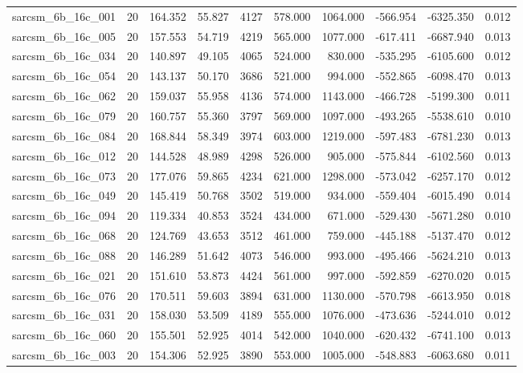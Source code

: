 \begin{tabular}{lrrrrrrrrr}
sarcsm\_6b\_16c\_001 & 20 & 164.352 & 55.827 & 4127 & 578.000 & 1064.000 & -566.954 & -6325.350 & 0.012 \\
sarcsm\_6b\_16c\_005 & 20 & 157.553 & 54.719 & 4219 & 565.000 & 1077.000 & -617.411 & -6687.940 & 0.013 \\
sarcsm\_6b\_16c\_034 & 20 & 140.897 & 49.105 & 4065 & 524.000 & 830.000 & -535.295 & -6105.600 & 0.012 \\
sarcsm\_6b\_16c\_054 & 20 & 143.137 & 50.170 & 3686 & 521.000 & 994.000 & -552.865 & -6098.470 & 0.013 \\
sarcsm\_6b\_16c\_062 & 20 & 159.037 & 55.958 & 4136 & 574.000 & 1143.000 & -466.728 & -5199.300 & 0.011 \\
sarcsm\_6b\_16c\_079 & 20 & 160.757 & 55.360 & 3797 & 569.000 & 1097.000 & -493.265 & -5538.610 & 0.010 \\
sarcsm\_6b\_16c\_084 & 20 & 168.844 & 58.349 & 3974 & 603.000 & 1219.000 & -597.483 & -6781.230 & 0.013 \\
sarcsm\_6b\_16c\_012 & 20 & 144.528 & 48.989 & 4298 & 526.000 & 905.000 & -575.844 & -6102.560 & 0.013 \\
sarcsm\_6b\_16c\_073 & 20 & 177.076 & 59.865 & 4234 & 621.000 & 1298.000 & -573.042 & -6257.170 & 0.012 \\
sarcsm\_6b\_16c\_049 & 20 & 145.419 & 50.768 & 3502 & 519.000 & 934.000 & -559.404 & -6015.490 & 0.014 \\
sarcsm\_6b\_16c\_094 & 20 & 119.334 & 40.853 & 3524 & 434.000 & 671.000 & -529.430 & -5671.280 & 0.010 \\
sarcsm\_6b\_16c\_068 & 20 & 124.769 & 43.653 & 3512 & 461.000 & 759.000 & -445.188 & -5137.470 & 0.012 \\
sarcsm\_6b\_16c\_088 & 20 & 146.289 & 51.642 & 4073 & 546.000 & 993.000 & -495.466 & -5624.210 & 0.013 \\
sarcsm\_6b\_16c\_021 & 20 & 151.610 & 53.873 & 4424 & 561.000 & 997.000 & -592.859 & -6270.020 & 0.015 \\
sarcsm\_6b\_16c\_076 & 20 & 170.511 & 59.603 & 3894 & 631.000 & 1130.000 & -570.798 & -6613.950 & 0.018 \\
sarcsm\_6b\_16c\_031 & 20 & 158.030 & 53.509 & 4189 & 555.000 & 1076.000 & -473.636 & -5244.010 & 0.012 \\
sarcsm\_6b\_16c\_060 & 20 & 155.501 & 52.925 & 4014 & 542.000 & 1040.000 & -620.432 & -6741.100 & 0.013 \\
sarcsm\_6b\_16c\_003 & 20 & 154.306 & 52.925 & 3890 & 553.000 & 1005.000 & -548.883 & -6063.680 & 0.011 \\

\end{tabular}
